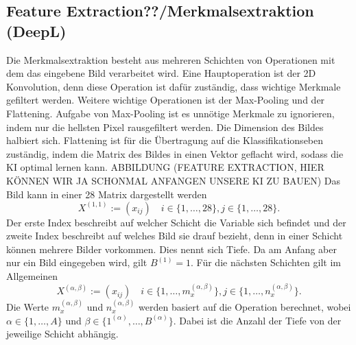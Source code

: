 \documentclass[11pt]{article}
\begin{document}
\subsection{Feature Extraction??/Merkmalsextraktion (DeepL)}
Die Merkmalsextraktion besteht aus mehreren Schichten von Operationen mit dem das eingebene Bild verarbeitet wird.
Eine Hauptoperation ist der 2D Konvolution, denn diese Operation ist dafür zuständig, dass wichtige Merkmale gefiltert werden.
Weitere wichtige Operationen ist der Max-Pooling und der Flattening. Aufgabe von Max-Pooling ist es unnötige Merkmale
zu ignorieren, indem nur die hellsten Pixel rausgefiltert werden. Die Dimension des Bildes halbiert sich. Flattening ist für die Übertragung auf die Klassifikationseben zuständig,
indem die Matrix des Bildes in einen Vektor geflacht wird, sodass die KI optimal lernen kann.
ABBILDUNG (FEATURE EXTRACTION, HIER KÖNNEN WIR JA SCHONMAL ANFANGEN UNSERE KI ZU BAUEN)
Das Bild kann in einer 28 Matrix dargestellt werden
\begin{equation}
    X^{(1,1)} := (x_{ij}) \quad i \in \{1,\ldots,28\}, j \in \{1,\ldots,28\}.
\end{equation}
Der erste Index beschreibt auf welcher Schicht die Variable sich befindet und der zweite Index beschreibt auf welches
Bild sie drauf bezieht, denn in einer Schicht können mehrere Bilder vorkommen. Dies nennt sich Tiefe. Da am Anfang aber nur ein Bild eingegeben wird, gilt
$B^{(1)} = 1$. Für die nächsten Schichten gilt im Allgemeinen
\begin{equation}
    X^{(\alpha,\beta)} := (x_{ij}) \quad i \in \{1,\ldots,m_{x}^{(\alpha,\beta)}\}, j \in \{1,\ldots,n_{x}^{(\alpha,\beta)}\}.
\end{equation}
Die Werte $m_{x}^{(\alpha,\beta)}$ und $n_{x}^{(\alpha,\beta)}$ werden basiert auf die Operation berechnet, wobei
$\alpha \in \{1,\ldots,A\}$ und $\beta \in \{1^{(\alpha)},\ldots,B^{(\alpha)}\}$. Dabei ist die Anzahl der Tiefe von der jeweilige Schicht abhängig.
\end{document}
